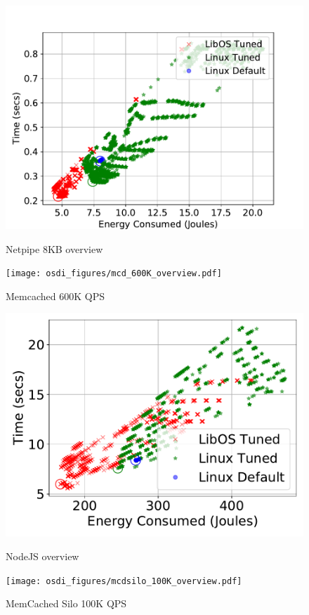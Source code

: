 \begin{figure}[htb]
\centering	
\begin{minipage}[t]{0.45\textwidth}
\includegraphics[width=\textwidth]{osdi_figures/netpipe_8192_overview.pdf}
	\caption{Netpipe 8KB overview}
	\label{fig:netpipe8Kov}
\end{minipage}
\begin{minipage}[t]{0.45\textwidth}
	\texttt{[image: osdi\_figures/mcd\_600K\_overview.pdf]}
	\caption{Memcached 600K QPS}
	\label{fig:mcdov}
\end{minipage}
\begin{minipage}[t]{0.45\textwidth}
	\includegraphics[width=\textwidth]{osdi_figures/nodejs_overview.pdf}
	\caption{NodeJS overview}
	\label{fig:nodejsov}
\end{minipage}
\begin{minipage}[t]{0.45\textwidth}
	\texttt{[image: osdi\_figures/mcdsilo\_100K\_overview.pdf]}
	\caption{MemCached Silo 100K QPS}
	\label{fig:mcdsilioov}
\end{minipage}
\end{figure}
